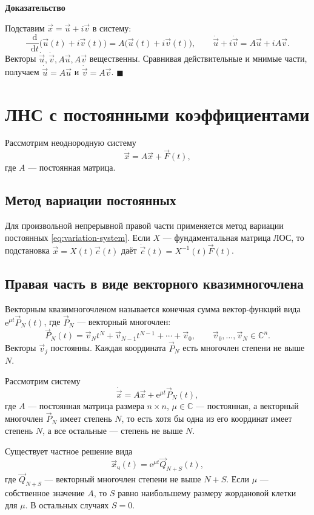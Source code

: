\documentclass[12pt,a4paper]{article}
\numberwithin{equation}{section}
\newcommand{\vect}[1]{\vec{#1}}
\newcommand{\e}{\mathrm{e}}
\newcommand{\dd}{\mathop{}\!\mathrm{d}}
\renewenvironment{proof}[1][Доказательство]{\begin{center}\textbf{#1}\end{center}}{\hfill$\blacksquare$\par}
\begin{document}
\begin{proof}
Подставим \(\vect x=\vect u+i\vect v\) в систему:
\[
 \frac{\dd}{\dd t}\bigl(\vect u(t)+i\vect v(t)\bigr)
 =A\bigl(\vect u(t)+i\vect v(t)\bigr),\qquad
 \dot{\vect u}+i\dot{\vect v}=A\vect u+iA\vect v.
\]
Векторы \(\dot{\vect u},\dot{\vect v},A\vect u,A\vect v\) вещественны.
Сравнивая действительные и мнимые части, получаем
\(\dot{\vect u}=A\vect u\) и \(\dot{\vect v}=A\vect v\).
\end{proof}

\section[ЛНС с постоянными коэффициентами]{ЛНС с постоянными коэффициентами}
Рассмотрим неоднородную систему
\[
 \dot{\vect x}=A\vect x+\vect F(t),
\]
где \(A\) --- постоянная матрица.

\subsection{Метод вариации постоянных}
Для произвольной непрерывной правой части применяется метод вариации
постоянных \eqref{eq:variation-system}. Если \(X\) --- фундаментальная матрица
ЛОС, то подстановка \(\vect x=X(t)\vect c(t)\) даёт
\(\dot{\vect c}(t)=X^{-1}(t)\vect F(t)\).

\subsection{Правая часть в виде векторного квазимногочлена}
Векторным квазимногочленом называется конечная сумма вектор-функций вида
\(\e^{\mu t}\vect P_N(t)\), где \(\vect P_N\) --- векторный многочлен:
\[
 \vect P_N(t)=\vect v_N t^N+\vect v_{N-1}t^{N-1}+\cdots+\vect v_0,
 \qquad \vect v_0,\ldots,\vect v_N\in\mathbb C^n.
\]
Векторы \(\vect v_j\) постоянны. Каждая координата \(\vect P_N\) есть
многочлен степени не выше \(N\).

\begin{theoremHSE}
Рассмотрим систему
\begin{equation}
 \dot{\vect x}=A\vect x+\e^{\mu t}\vect P_N(t),
 \label{eq:lns-vector-quasipolynomial}
\end{equation}
где \(A\) --- постоянная матрица размера \(n\times n\),
\(\mu\in\mathbb C\) --- постоянная, а векторный многочлен
\(\vect P_N\) имеет степень \(N\), то есть хотя бы одна из его координат
имеет степень \(N\), а все остальные --- степень не выше \(N\).

Существует частное решение вида
\[
 \vect x_{\text{ч}}(t)=\e^{\mu t}\vect Q_{N+S}(t),
\]
где \(\vect Q_{N+S}\) --- векторный многочлен степени не выше \(N+S\).
Если \(\mu\) --- собственное значение \(A\), то \(S\) равно наибольшему
размеру жордановой клетки для \(\mu\). В остальных случаях \(S=0\).
\end{theoremHSE}
\end{document}
